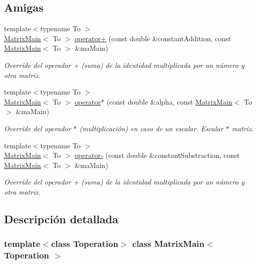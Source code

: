 \subsection*{Amigas}
\begin{DoxyCompactItemize}
\item 
{\footnotesize template$<$typename To $>$ }\\\hyperlink{classMatrixMain}{Matrix\+Main}$<$ To $>$ \hyperlink{classMatrixMain_a83759ded6e3b7e9182b65f7ad77853a8}{operator+} (const double \&constant\+Addition, const \hyperlink{classMatrixMain}{Matrix\+Main}$<$ To $>$ \&ma\+Main)
\begin{DoxyCompactList}\small\item\em Override del operador + (suma) de la identidad multiplicada por un número y otra matriz. \end{DoxyCompactList}\item 
{\footnotesize template$<$typename To $>$ }\\\hyperlink{classMatrixMain}{Matrix\+Main}$<$ To $>$ \hyperlink{classMatrixMain_addc3df8f6d3a91a9e8e23005d0a099e2}{operator$\ast$} (const double \&alpha, const \hyperlink{classMatrixMain}{Matrix\+Main}$<$ To $>$ \&ma\+Main)
\begin{DoxyCompactList}\small\item\em Override del operador $\ast$ (multiplicación) en caso de un escalar. Escalar $\ast$ matriz. \end{DoxyCompactList}\item 
{\footnotesize template$<$typename To $>$ }\\\hyperlink{classMatrixMain}{Matrix\+Main}$<$ To $>$ \hyperlink{classMatrixMain_a01ae6469adf07f6a6b0f220beab3ed1d}{operator-\/} (const double \&constant\+Substraction, const \hyperlink{classMatrixMain}{Matrix\+Main}$<$ To $>$ \&ma\+Main)
\begin{DoxyCompactList}\small\item\em Override del operador + (suma) de la identidad multiplicada por un número y otra matriz. \end{DoxyCompactList}\end{DoxyCompactItemize}


\subsection{Descripción detallada}
\subsubsection*{template$<$class Toperation$>$\newline
class Matrix\+Main$<$ Toperation $>$}

